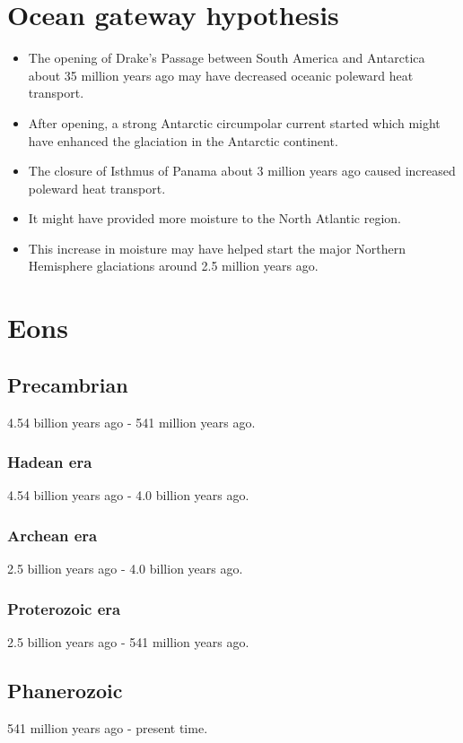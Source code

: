 \documentclass[11pt]{article}
\begin{document}
\section{Ocean gateway hypothesis}
\label{sec:org499d5db}
\begin{itemize}
\item The opening of Drake's Passage between South America and Antarctica about 35 million years ago may have decreased oceanic poleward heat transport.
\item After opening, a strong Antarctic circumpolar current started which might have enhanced the glaciation in the Antarctic continent.
\item The closure of Isthmus of Panama about 3 million years ago caused increased poleward heat transport.
\item It might have provided more moisture to the North Atlantic region.
\item This increase in moisture may have helped start the major Northern Hemisphere glaciations around 2.5 million years ago.
\end{itemize}
\section{Eons}
\label{sec:org286bd26}

\subsection{Precambrian}
\label{sec:orgde0b67b}
4.54 billion years ago - 541 million years ago.
\subsubsection{Hadean era}
\label{sec:org2e4e7bc}
4.54 billion years ago - 4.0 billion years ago.
\subsubsection{Archean era}
\label{sec:org27f19e7}
2.5 billion years ago - 4.0 billion years ago.
\subsubsection{Proterozoic era}
\label{sec:orgcdc4e1d}
2.5 billion years ago - 541 million years ago.
\subsection{Phanerozoic}
\label{sec:org35b3d9c}
541 million years ago - present time.
\end{document}
